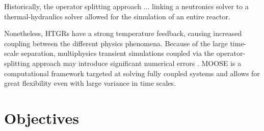 \documentclass[11pt,letterpaper]{article}
\begin{document}
Historically, the operator splitting approach ...
linking a neutronics solver to a thermal-hydraulics solver allowed for the simulation of an entire reactor.


Nonetheless, \glspl{HTGR} have a strong temperature feedback, causing increased coupling between the different physics phenomena.
Because of the large time-scale separation, multiphysics transient simulations coupled via the operator-splitting approach may introduce significant numerical errors \cite{ragusa_consistent_2009} \cite{park_tightly_2010}.
\gls{MOOSE} \cite{gaston_moose_2009} is a computational framework targeted at solving fully coupled systems and allows for great flexibility even with large variance in time scales.






\section{Objectives}


\pagebreak


\end{document}
